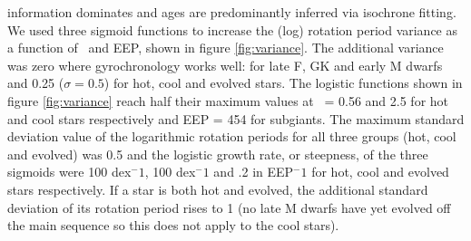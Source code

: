 information dominates and ages are predominantly inferred via isochrone
fitting.
We used three sigmoid functions to increase the (log) rotation period variance
as a function of \gcolor\ and EEP, shown in figure \ref{fig:variance}.
The additional variance was zero where gyrochronology works well: for late F,
GK and early M dwarfs and 0.25 ($\sigma = 0.5$) for hot, cool and evolved
stars.
The logistic functions shown in figure \ref{fig:variance} reach half their
maximum values at \gcolor\ = 0.56 and 2.5 for hot and cool stars respectively
and EEP = 454 for subgiants.
The maximum standard deviation value of the logarithmic rotation periods for
all three groups (hot, cool and evolved) was 0.5 and the logistic growth rate,
or steepness, of the three sigmoids were 100 dex$^-1$, 100 dex$^-1$ and
.2 in EEP$^-1$ for hot, cool and evolved stars respectively.
If a star is both hot and evolved, the additional standard deviation of its
rotation period rises to 1 (no late M dwarfs have yet evolved off the main
sequence so this does not apply to the cool stars).
